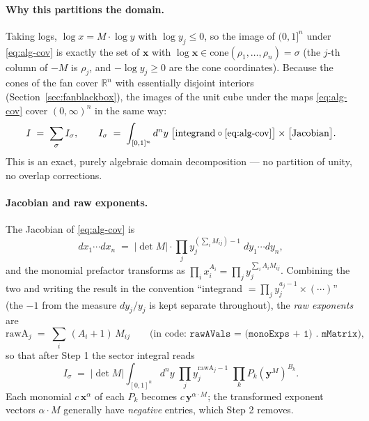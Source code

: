 \documentclass[11pt,a4paper]{article}
\begin{document}
\paragraph{Why this partitions the domain.} Taking logs,
$\log x = M \cdot \log y$ with $\log y_j \leq 0$, so the image of $(0,1]^n$
under \eqref{eq:alg-cov} is exactly the set of $\mathbf{x}$ with
$\log \mathbf{x} \in \mathrm{cone}(\rho_1, \ldots, \rho_n) = \sigma$ (the
$j$-th column of $-M$ is $\rho_j$, and $-\log y_j \geq 0$ are the cone
coordinates). Because the cones of the fan cover $\mathbb{R}^n$ with
essentially disjoint interiors (Section~\ref{sec:fanblackbox}), the images of
the unit cube under the maps \eqref{eq:alg-cov} cover $(0,\infty)^n$ in the
same way:
\begin{equation}
I \;=\; \sum_{\sigma} I_\sigma, \qquad
I_\sigma \;=\; \int_{[0,1]^n} d^n y \;\bigl[\text{integrand} \circ
\eqref{eq:alg-cov}\bigr] \times \bigl[\text{Jacobian}\bigr].
\end{equation}
This is an exact, purely algebraic domain decomposition --- no partition of
unity, no overlap corrections.

\paragraph{Jacobian and raw exponents.} The Jacobian of \eqref{eq:alg-cov} is
\begin{equation}
dx_1 \cdots dx_n \;=\; |\det M| \cdot \prod_j y_j^{\left(\sum_i M_{ij}\right) - 1}
\; dy_1 \cdots dy_n ,
\end{equation}
and the monomial prefactor transforms as $\prod_i x_i^{A_i} =
\prod_j y_j^{\sum_i A_i M_{ij}}$. Combining the two and writing the result in
the convention ``integrand $= \prod_j y_j^{a_j - 1} \times (\cdots)$'' (the
$-1$ from the measure $dy_j/y_j$ is kept separate throughout), the
\emph{raw exponents} are
\begin{equation}\label{eq:alg-rawA}
\mathrm{rawA}_j \;=\; \sum_i \,(A_i + 1)\, M_{ij}
\qquad\text{(in code: } \texttt{rawAVals = (monoExps + 1) . mMatrix}\text{)},
\end{equation}
so that after Step 1 the sector integral reads
\begin{equation}
I_\sigma \;=\; |\det M| \int_{[0,1]^n} d^n y\;
\prod_j y_j^{\mathrm{rawA}_j - 1} \;\prod_k P_k(\mathbf{y}^M)^{B_k}.
\end{equation}
Each monomial $c\,\mathbf{x}^\alpha$ of each $P_k$ becomes
$c\,\mathbf{y}^{\alpha \cdot M}$; the transformed exponent vectors
$\alpha \cdot M$ generally have \emph{negative} entries, which Step 2 removes.
\end{document}
